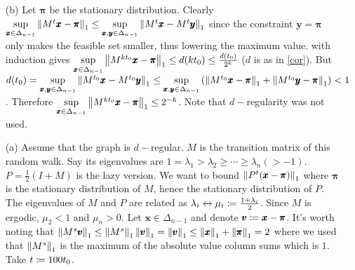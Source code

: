 \begin{enumerate}[leftmargin=*, label=(\alph*)]
\item[(b)] Let $\pmb \pi$ be the stationary distribution. Clearly $\sup\limits_{\pmb x\in \Delta_{n-1}}\left\lVert M^{t}\pmb x-\pmb \pi \right\rVert_{1} \le \sup\limits_{\pmb x,\pmb y\in \Delta_{n-1}}\left\lVert M^{t}\pmb x-M^{t}\pmb y \right\rVert_{1}$ since the constraint $\pmb y=\pmb \pi$ only makes the feasible set smaller, thus lowering the maximum value.  with induction gives $\sup\limits_{\pmb x\in \Delta_{n-1}}\left\lVert M^{kt_{0}}\pmb x-\pmb \pi \right\rVert_{1} \le d(kt_{0}) \le \frac{d(t_{0})}{2^{k}}$ ($d$ is as in \cref{cor}). But $d(t_{0}) = \sup\limits_{\pmb x,\pmb y\in\Delta_{n-1}}\left\lVert M^{t_{0}}\pmb x-M^{t_{0}}\pmb y \right\rVert_{1} \le \sup\limits_{\pmb x,\pmb y\in\Delta_{n-1}}\left(\left\lVert M^{t_{0}}\pmb x -\pmb \pi \right\rVert_{1}+\left\lVert M^{t_{0}}\pmb y-\pmb \pi \right\rVert_{1}\right) <1$. Therefore $\sup\limits_{\pmb x\in \Delta_{n-1}}\left\lVert M^{kt_{0}}\pmb x-\pmb \pi \right\rVert_{1} \le 2^{-k}$. Note that $d-$regularity was not used.
\item[(a)]Assume that the graph is $d-$regular. $M$ is the transition matrix of this random walk. Say its eigenvalues are $1=\lambda_{1} > \lambda_{2} \ge \cdots \ge \lambda_{n} (>-1)$. $P=\frac{1}{2}(I+M)$ is the lazy version. We want to bound $\left\lVert P^{t}(\pmb x-\pmb \pi) \right\rVert_{1}$ where $\pmb \pi$ is the stationary distribution of $M$, hence the stationary distribution of $P$. The eigenvalues of $M$ and $P$ are related as $\lambda_{i} \leftrightarrow \mu_{i}\coloneqq\frac{1+\lambda_{i}}{2}$. Since $M$ is ergodic, $\mu_{2}<1$ and $\mu_{n}>0$. Let $\pmb x\in \Delta_{n-1}$ and denote $\pmb v\coloneqq\pmb x-\pmb \pi$. It's worth noting that $\left\lVert M^{s}\pmb v \right\rVert_{1} \le \left\lVert M^{s} \right\rVert_{1}\left\lVert \pmb v \right\rVert_{1} = \left\lVert \pmb v \right\rVert_{1} \le \left\lVert \pmb x \right\rVert_{1}+\left\lVert \pmb \pi \right\rVert_{1} = 2$ where we used that $\left\lVert M^{s} \right\rVert_{1}$ is the maximum of the absolute value column sums which is $1$. Take $t \coloneqq 100t_{0}$.

\end{enumerate}
